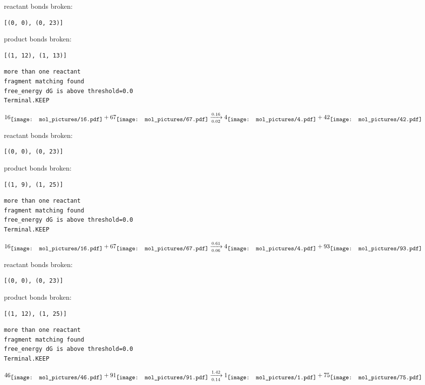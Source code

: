 \documentclass{article}
\begin{document}
reactant bonds broken:\begin{verbatim}
[(0, 0), (0, 23)]
\end{verbatim}
product bonds broken:\begin{verbatim}
[(1, 12), (1, 13)]
\end{verbatim}




\vspace{1cm}
\begin{verbatim}
more than one reactant
fragment matching found
free_energy dG is above threshold=0.0
Terminal.KEEP
\end{verbatim}
$$
16
\raisebox{-.5\height}{\texttt{[image: mol\_pictures/16.pdf]}}
+
67
\raisebox{-.5\height}{\texttt{[image: mol\_pictures/67.pdf]}}
\xrightarrow[0.02]{0.16}
4
\raisebox{-.5\height}{\texttt{[image: mol\_pictures/4.pdf]}}
+
42
\raisebox{-.5\height}{\texttt{[image: mol\_pictures/42.pdf]}}
$$


reactant bonds broken:\begin{verbatim}
[(0, 0), (0, 23)]
\end{verbatim}
product bonds broken:\begin{verbatim}
[(1, 9), (1, 25)]
\end{verbatim}




\vspace{1cm}
\begin{verbatim}
more than one reactant
fragment matching found
free_energy dG is above threshold=0.0
Terminal.KEEP
\end{verbatim}
$$
16
\raisebox{-.5\height}{\texttt{[image: mol\_pictures/16.pdf]}}
+
67
\raisebox{-.5\height}{\texttt{[image: mol\_pictures/67.pdf]}}
\xrightarrow[0.06]{0.61}
4
\raisebox{-.5\height}{\texttt{[image: mol\_pictures/4.pdf]}}
+
93
\raisebox{-.5\height}{\texttt{[image: mol\_pictures/93.pdf]}}
$$


reactant bonds broken:\begin{verbatim}
[(0, 0), (0, 23)]
\end{verbatim}
product bonds broken:\begin{verbatim}
[(1, 12), (1, 25)]
\end{verbatim}




\vspace{1cm}
\begin{verbatim}
more than one reactant
fragment matching found
free_energy dG is above threshold=0.0
Terminal.KEEP
\end{verbatim}
$$
46
\raisebox{-.5\height}{\texttt{[image: mol\_pictures/46.pdf]}}
+
91
\raisebox{-.5\height}{\texttt{[image: mol\_pictures/91.pdf]}}
\xrightarrow[0.14]{1.42}
1
\raisebox{-.5\height}{\texttt{[image: mol\_pictures/1.pdf]}}
+
75
\raisebox{-.5\height}{\texttt{[image: mol\_pictures/75.pdf]}}
$$
\end{document}
